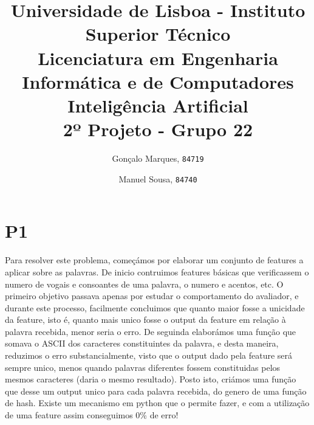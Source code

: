 \documentclass{scrartcl}
\begin{document}

\title{
	\textnormal{
	\LARGE Universidade de Lisboa - Instituto Superior Técnico\\
	\Large Licenciatura em Engenharia Informática e de Computadores\\
	\Large Inteligência Artificial
\\}
	\LARGE2º Projeto - Grupo 22
	\vspace{-1ex}
	}
\author{Gonçalo Marques,
	\texttt{84719}
	\and
	Manuel Sousa,
	\texttt{84740}
}
\date{	\vspace{-1ex}
		\vspace{-4ex}
	}
\maketitle

\section*{P1}

Para resolver este problema, começámos por elaborar um conjunto de features a aplicar sobre as palavras. De inicio contruimos features básicas que verificassem o numero de vogais e consoantes de uma palavra, o numero e acentos, etc. O primeiro objetivo passava apenas por estudar
o comportamento do avaliador, e durante este processo, facilmente concluimos que quanto maior fosse a unicidade da feature, isto é, quanto mais unico fosse o output da feature em relação à palavra recebida, menor seria o erro. De seguinda elaborámos uma função que somava o ASCII dos caracteres
constituintes da palavra, e desta maneira, reduzimos o erro substancialmente, visto que o output dado pela feature será sempre unico, menos quando palavras diferentes fossem constituidas pelos mesmos caracteres (daria o mesmo resultado). Posto isto, criámos uma função que desse um output unico para 
cada palavra recebida, do genero de uma função de hash. Existe um mecanismo em python que o permite fazer, e com a utilização de uma feature assim conseguimos 0\% de erro!
\end{document}
